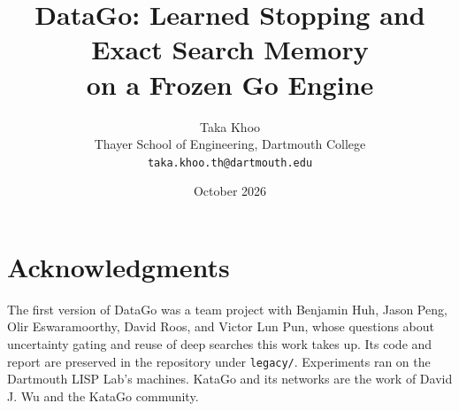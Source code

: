 \documentclass[11pt]{article}
\title{DataGo: Learned Stopping and Exact Search Memory\\ on a Frozen Go Engine}
\author{Taka Khoo\\[2pt]
Thayer School of Engineering, Dartmouth College\\
\texttt{taka.khoo.th@dartmouth.edu}}
\date{October 2026}
\begin{document}
\maketitle











\section*{Acknowledgments}
The first version of DataGo was a team project with Benjamin Huh, Jason Peng, Olir Eswaramoorthy, David Roos, and Victor Lun Pun, whose questions about uncertainty gating and reuse of deep searches this work takes up. Its code and report are preserved in the repository under \texttt{legacy/}. Experiments ran on the Dartmouth LISP Lab's machines. KataGo and its networks are the work of David J. Wu and the KataGo community.



\end{document}

